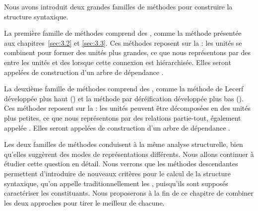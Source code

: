 Nous avons introduit deux grandes familles de méthodes pour construire la structure syntaxique.

La première famille de méthodes comprend des , comme la méthode présentée aux chapitres~\ref{sec:3.2} et \ref{sec:3.3}. Ces méthodes reposent sur la  : les unités se combinent pour former des unités plus grandes, ce que nous représentons par des  entre les unités et des  lorsque cette connexion est hiérarchisée. Elles seront appelées  de construction d’un arbre de dépendance .

La deuxième famille de méthodes comprend des , com\-me la méthode de Lecerf développée plus haut () et la méthode par déréification développée plus bas (). Ces méthodes reposent sur la : les unités peuvent être décomposées en des unités plus petites, ce que nous représentons par des relations partie-tout, également appelée . Elles seront appelées  de construction d’un arbre de dépendance .

Les deux familles de méthodes conduisent à la même analyse structurelle, bien qu’elles suggèrent des modes de représentations différents. Nous allons continuer à étudier cette question en détail. Nous verrons que les méthodes descendantes permettent d’introduire de nouveaux critères pour le calcul de la structure syntaxique, qu’on appelle traditionnellement les , puisqu’ils sont supposés caractériser les constituants. Nous proposerons à la fin de ce chapitre de combiner les deux approches pour tirer le meilleur de chacune.%


